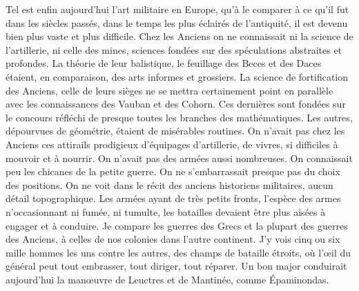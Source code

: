 \documentclass[french,twoside]{book} %
\begin{document}
Tel est enfin aujourd’hui l’art militaire en Europe, qu’à le comparer à ce qu’il fut dans les siècles passés, dans le temps les plus éclairés de l’antiquité, il est devenu bien plus vaste et plus difficile. Chez les Anciens on ne connaissait ni la science de l’artillerie, ni celle des mines, sciences fondées sur des spéculations abstraites et profondes. La théorie de leur balistique, le feuillage des Beces et des Daces étaient, en comparaison, des arts informes et grossiers. La science de fortification des Anciens, celle de leurs sièges ne se mettra certainement point en parallèle avec les connaissances des Vauban et des Cohorn. Ces dernières sont fondées sur le concours réfléchi de presque toutes les branches des mathématiques. Les autres, dépourvues de géométrie, étaient de misérables routines. On n’avait pas chez les Anciens ces attirails prodigieux d’équipages d’artillerie, de vivres, si difficiles à mouvoir et à nourrir. On n’avait pas des armées aussi nombreuses. On connaissait peu les chicanes de la petite guerre. On ne s’embarrassait presque pas du choix des positions. On ne voit dans le récit des anciens historiens militaires, aucun détail topographique. Les armées ayant de très petits fronts, l’espèce des armes n’occasionnant ni fumée, ni tumulte, les batailles devaient être plus aisées à engager et à conduire. Je compare les guerres des Grecs et la plupart des guerres des Anciens, à celles de nos colonies dans l’autre continent. J’y vois cinq ou six mille hommes les uns contre les autres, des champs de bataille étroits, où l’œil du général peut tout embrasser, tout diriger, tout réparer. Un bon major conduirait aujourd’hui la manœuvre de Leuctres et de Mantinée, comme Épaminondas.\par
\end{document}
